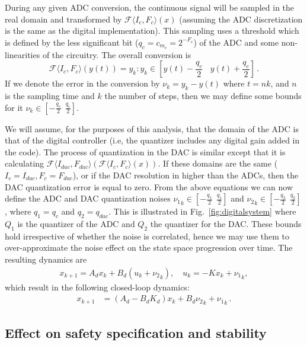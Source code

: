 \documentclass[twocolumn]{autart}    %
\begin{document}
During any given ADC conversion, the continuous signal will be sampled in
the real domain and transformed by $\mathcal{F}\langle I_{c},F_{c} \rangle
(x)$ (assuming the ADC discretization is the same as the digital
implementation).  This sampling uses a threshold which is defined by the
less significant bit ($q_{c}=c_{m_c}=2^{-F_c}$) 
of the ADC and some non-linearities of the circuitry.  The overall conversion is
%
$$\mathcal{F}\langle I_{c},F_{c} \rangle(y(t)) = y_k :
y_k \in \left[y(t)-\frac{q_{c}}{2}\ \ \ \ y(t)+\frac{q_{c}}{2}\right] \,.$$
%
If we denote the error in the conversion by $\nu_k=y_k-y(t)$ where $t = nk$,
and $n$ is the sampling time and $k$ the number of steps, then we may define
some bounds for it $\nu_k \in [-\frac{q_{c}}{2}\ \ \frac{q_{c}}{2}]$.

We will assume, for the purposes of this analysis, that the domain of the
ADC is that of the digital controller (i.e, the quantizer includes any
digital gain added in the code).  The process of quantization in the DAC is
similar except that it is calculating $\mathcal{F}\langle I_{dac},F_{dac}
\rangle (\mathcal{F}\langle I_{c},F_{c} \rangle (x)) $.  If these domains
are the same ($I_{c}=I_{dac},\allowbreak F_{c}=F_{dac}$), or if the DAC
resolution in higher than the ADCs, then the DAC quantization error is equal
to zero.  From the above equations we can now define the ADC and DAC
quantization noises ${\nu_1}_k \in [-\frac{q_1}{2}\ \ \frac{q_1}{2}]$ and
${\nu_2}_k \in [-\frac{q_2}{2}\ \ \frac{q_2}{2}]$, where $q_1=q_{c}$ and 
$q_2=q_\mathit{dac}$.  This is illustrated in
Fig.~\ref{fig:digitalsystem} where $Q_1$ is the quantizer of the ADC
and $Q_2$ the quantizer for the DAC.  These bounds hold irrespective of
whether the noise is correlated, hence we may use them to over-approximate
the noise effect on the state space progression over time.  The
resulting dynamics are
%
\begin{align*}
{x}_{k+1} = {A}_d{x}_k+{B}_d({u}_k+{{\nu}_2}_k), \quad u_k = -K{x}_{k}+{{\nu}_1}_k, 
\end{align*}
%
which result in the following closed-loop dynamics:
%
\begin{align*}
{x}_{k+1} &= ({A}_d-{B}_d{K}_d) {x}_k+{B}_d{{\nu}_2}_k +{{\nu}_1}_k \,. 
\end{align*}




\subsection{Effect on safety specification and stability}
\end{document}
